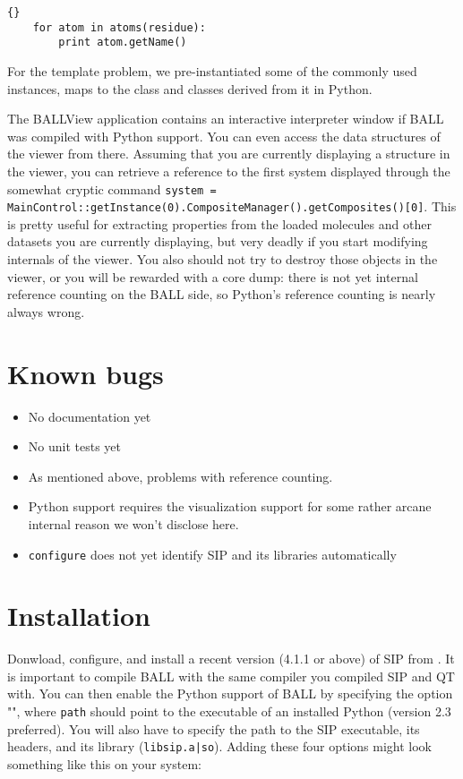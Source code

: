 \begin{lstlisting}{}
	for atom in atoms(residue):
		print atom.getName()
\end{lstlisting}

\noindent For the template problem, we pre-instantiated some of the 
commonly used instances, \eg {} maps to the 
 class and classes derived from it in Python.

The BALLView application contains an interactive interpreter window
if BALL was compiled with Python support. You can even access the
data structures of the viewer from there. Assuming that you are
currently displaying a structure in the viewer, you can retrieve a
reference to the first system displayed through the somewhat cryptic
command {\tt system =
MainControl::getInstance(0).CompositeManager().getComposites()[0]}.
This is pretty useful for extracting properties from the loaded molecules
and other datasets you are
currently displaying, but very deadly if you start modifying internals
of the viewer. You also should not try to destroy those objects in the
viewer, or you will be rewarded with a core dump: there is not yet
internal reference counting on the BALL side, so Python's reference
counting is nearly always wrong.
		

\section{Known bugs}
\begin{itemize}
	\item No documentation yet
	\item No unit tests yet
	\item As mentioned above, problems with reference counting.
	\item Python support requires the visualization support for some rather
				arcane internal reason we won't disclose here.
	\item {\tt configure} does not yet identify SIP and its libraries
				automatically
\end{itemize}

\section{Installation}

Donwload, configure, and install a recent version (4.1.1 or above) of SIP from 
. It is important to compile BALL 
with the same \CPP compiler you compiled SIP and QT with. You can then enable the Python support of BALL
by specifying the option \mbox{""}, where
{\tt path} should point to the executable of an installed Python (version 2.3
preferred). You will also have to specify the path to the SIP executable, its
headers, and its library ({\tt libsip.a|so}). Adding these four options might
look something like this on your system:

